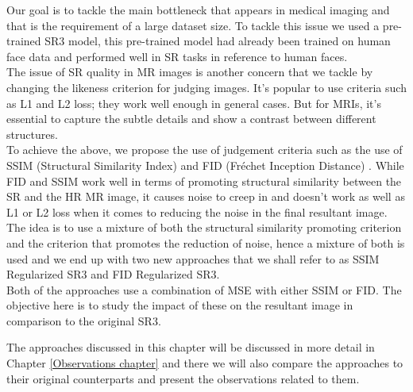 Our goal is to tackle the main bottleneck that appears in medical imaging and that is the requirement of a large dataset size. To tackle this issue we used a pre-trained SR3 model, this pre-trained model had already been trained on human face data and performed well in SR tasks in reference to human faces.\\

The issue of SR quality in MR images is another concern that we tackle by changing the likeness criterion for judging images. It's popular to use criteria such as L1 and L2 loss; they work well enough in general cases. But for MRIs, it's essential to capture the subtle details and show a contrast between different structures.\\

To achieve the above, we propose the use of judgement criteria such as the use of SSIM (Structural Similarity Index) \cite{1284395} and FID (Fréchet Inception Distance) \cite{fid}. While FID and SSIM work well in terms of promoting structural similarity between the SR and the HR MR image, it causes noise to creep in and doesn't work as well as L1 or L2 loss when it comes to reducing the noise in the final resultant image.\\

The idea is to use a mixture of both the structural similarity promoting criterion and the criterion that promotes the reduction of noise, hence a mixture of both is used and we end up with two new approaches that we shall refer to as SSIM Regularized SR3 and FID Regularized SR3.\\

Both of the approaches use a combination of MSE with either SSIM or FID. The objective here is to study the impact of these on the resultant image in comparison to the original SR3.\\


The approaches discussed in this chapter will be discussed in more detail in Chapter \ref{Observations chapter} and there we will also compare the approaches to their original counterparts and present the observations related to them.




